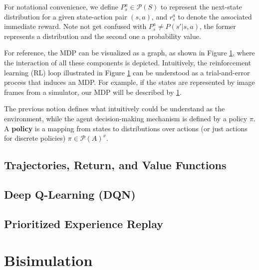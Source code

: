 For notational convenience, we define $P^a_s \in \mathcal{P}(S)$ to represent the next-state distribution for a given state-action pair $(s, a)$, and $r^a_s$ to denote the associated immediate reward. Note not get confused with $P^a_s \neq P(s'|s, a)$, the former represents a distribution and the second one a probability value.

For reference, the MDP can be visualized as a graph, as shown in Figure \ref{}, where the interaction of all these components is depicted. Intuitively, the reinforcement learning (RL) loop illustrated in Figure \ref{} can be understood as a trial-and-error process that induces an MDP. For example, if the states are represented by image frames from a simulator, our MDP will be described by \ref{}.

The previous notion defines what intuitively could be understand as the environment, while the agent decision-making mechanism is defined by a policy $\pi$. A \textbf{policy} is a mapping from states to distributions over actions (or just actions for discrete policies) $\pi \in \mathcal{P}(A)^x$.

\subsection{Trajectories, Return, and Value Functions}




\subsection{Deep Q-Learning (DQN)}
\subsection{Prioritized Experience Replay}

\section{Bisimulation}

